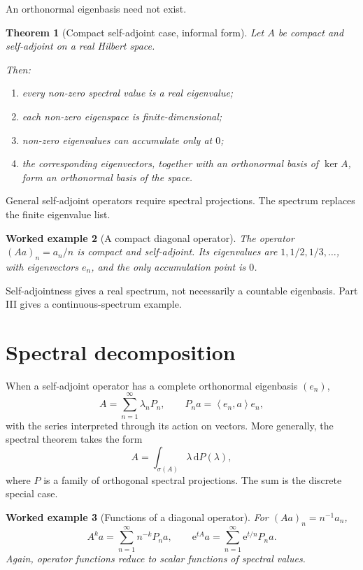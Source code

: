 \documentclass[11pt,a5paper,oneside,openany]{scrreprt}
\theoremstyle{notes}
\newtheorem{theorem}{Theorem}[section]
\theoremstyle{definitions}
\newtheorem{example}[theorem]{Worked example}
\newcommand{\ip}[2]{\left\langle #1,#2\right\rangle}
\newcommand{\Ker}{\operatorname{ker}}
\newcommand{\dd}{\,\mathrm{d}}
\newcommand{\e}{\mathrm{e}}
\begin{document}
An orthonormal eigenbasis need not exist.

\begin{theorem}[Compact self-adjoint case, informal form]
Let $A$ be compact and self-adjoint on a real Hilbert space.

Then:
\begin{enumerate}[label=(\roman*),leftmargin=2.7em]
  \item every non-zero spectral value is a real eigenvalue;
  \item each non-zero eigenspace is finite-dimensional;
  \item non-zero eigenvalues can accumulate only at $0$;
  \item the corresponding eigenvectors, together with an orthonormal basis of
  $\Ker A$, form an orthonormal basis of the space.
\end{enumerate}
\end{theorem}

General self-adjoint operators require spectral projections.  The spectrum
replaces the finite eigenvalue list.

\begin{example}[A compact diagonal operator]
The operator $(Aa)_n=a_n/n$ is compact and self-adjoint.  Its eigenvalues are
$1,1/2,1/3,\ldots$, with eigenvectors $e_n$, and the only accumulation point
is $0$.
\end{example}

\begin{caution}
Self-adjointness gives a real spectrum, not necessarily a countable
eigenbasis.  Part III gives a continuous-spectrum example.
\end{caution}

\section{Spectral decomposition}

When a self-adjoint operator has a complete orthonormal eigenbasis $(e_n)$,
\[
  \boxed{A=\sum_{n=1}^{\infty}\lambda_nP_n},
  \qquad P_na=\ip{e_n}{a}e_n,
\]
with the series interpreted through its action on vectors.  More generally,
the spectral theorem takes the form
\[
  \boxed{A=\int_{\sigma(A)}\lambda\dd P(\lambda)},
\]
where $P$ is a family of orthogonal spectral projections.  The sum is the
discrete special case.

\begin{example}[Functions of a diagonal operator]
For $(Aa)_n=n^{-1}a_n$,
\[
 A^ka=\sum_{n=1}^{\infty}n^{-k}P_na,
 \qquad
 \e^{tA}a=\sum_{n=1}^{\infty}\e^{t/n}P_na.
\]
Again, operator functions reduce to scalar functions of spectral values.
\end{example}
\end{document}
